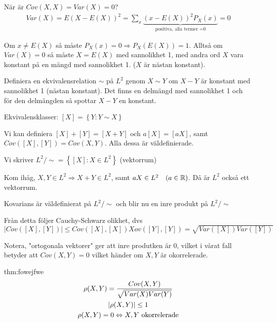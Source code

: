 \par\bigskip
\noindent När är $Cov(X,X) = Var(X) = 0$?
\begin{equation*}
  \begin{gathered}
    Var(X) = E(X-E(X))^2 = \sum_{x}\underbrace{(x-E(X))^2P_X(x)}_{\text{positiva, alla termer =0}}= 0
  \end{gathered}
\end{equation*}\par
\noindent Om $x\neq E(X)$ så måste $P_X(x)=0\Rightarrow P_X(E(X))=1$. Alltså om $Var(X)=0$ så måste $X=E(X)$ med sannolikhet 1, med andra ord $X$ vara konstant på en mängd med sannolikhet 1. ($X$ är nästan konstant).
\par\bigskip
\noindent Definiera en ekvivalensrelation $\sim$ på $L^2$ genom $X\sim Y$ om $X-Y$ är konstant med sannolikhet 1 (nästan konstant). Det finns en delmängd med sannolikhet 1 och för den delmängden så spottar $X-Y$ en konstant.
\par\bigskip
\noindent Ekvivalensklasser: $[X] = \left\{Y:Y\sim X\right\}$\par
\noindent Vi kan definiera $[X]+[Y] = [X+Y]$ och $a[X] = [aX]$, samt $Cov([X],[Y]) = Cov(X,Y)$. Alla dessa är väldefinierade.
\par\bigskip
\noindent Vi skriver $L^2/\sim = \left\{[X]:X\in L^2\right\}$ (vektorrum)\par
\noindent Kom ihåg, $X,Y\in L^2\Rightarrow X+Y\in L^2$, samt $aX\in L^2\quad (a\in\mathbb{R})$. Då är $L^2$ också ett vektorrum.
\par\bigskip
\noindent Kovarians är väldefinierat på $L^2/\sim$ och blir nu en inre produkt på $L^2/\sim$\par
\noindent Från detta följer Cauchy-Schwarz olikhet, dvs $\left|Cov([X],[Y])\right|\leq Cov([X],[X])Xov([Y],[Y]) = \sqrt{Var([X])Var([Y])}$\par
\noindent Notera, "ortogonala vektorer" ger att inre produtken är 0, vilket i vårat fall betyder att $Cov(X,Y)=0$ vilket händer om $X,Y$ är okorrelerade.
\par\bigskip
\begin{theo}[Korrelationskoefficienten]{thm:fowejfwe}
  \begin{equation*}
    \begin{gathered}
      \rho(X,Y) = \dfrac{Cov(X,Y)}{\sqrt{Var(X)Var(Y)}}\\
      \left|\rho(X,Y)\right|\leq1\\
      \rho(X,Y) =0\Leftrightarrow X,Y\text{ okorrelerade}
    \end{gathered}
  \end{equation*}
\end{theo}
